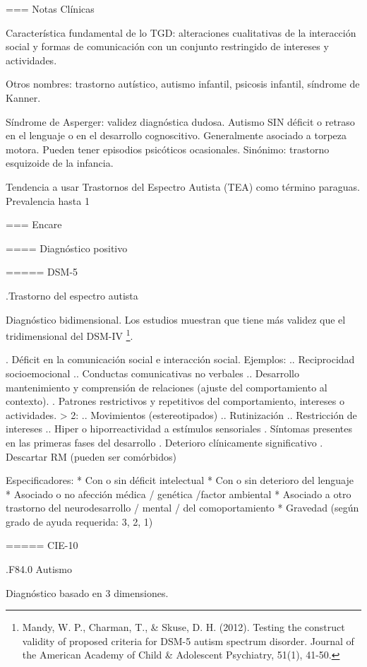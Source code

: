 \documentclass{scrbook}
\begin{document}
=== Notas Clínicas

Característica fundamental de lo TGD: alteraciones cualitativas de la interacción social y formas de comunicación con un conjunto restringido de intereses y actividades.

Otros nombres: trastorno autístico, autismo infantil, psicosis infantil, síndrome de Kanner.

Síndrome de Asperger: validez diagnóstica dudosa. Autismo SIN déficit o retraso en el lenguaje o en el desarrollo cognoscitivo. Generalmente asociado a torpeza motora. Pueden tener episodios psicóticos ocasionales. Sinónimo: trastorno esquizoide de la infancia.

Tendencia a usar Trastornos del Espectro Autista (TEA) como término paraguas. Prevalencia hasta 1%

=== Encare

==== Diagnóstico positivo

===== DSM-5

.Trastorno del espectro autista

Diagnóstico bidimensional. Los estudios muestran que tiene más validez que el tridimensional del DSM-IV \footnote{Mandy, W. P., Charman, T., \& Skuse, D. H. (2012). Testing the construct validity of proposed criteria for DSM-5 autism spectrum disorder. Journal of the American Academy of Child \& Adolescent Psychiatry, 51(1), 41-50.}.

. Déficit en la comunicación social e interacción social. Ejemplos:
.. Reciprocidad socioemocional
.. Conductas comunicativas no verbales
.. Desarrollo mantenimiento y comprensión de relaciones (ajuste del comportamiento al contexto).
. Patrones restrictivos y repetitivos del comportamiento, intereses o actividades. > 2:
.. Movimientos (estereotipados)
.. Rutinización
.. Restricción de intereses
.. Hiper o hiporreactividad a estímulos sensoriales
. Síntomas presentes en las primeras fases del desarrollo
. Deterioro clínicamente significativo
. Descartar RM (pueden ser comórbidos)

Especificadores:
* Con o sin déficit intelectual
* Con o sin deterioro del lenguaje
* Asociado o no afección médica / genética /factor ambiental
* Asociado a otro trastorno del neurodesarrollo / mental / del comoportamiento
* Gravedad (según grado de ayuda requerida: 3, 2, 1)

===== CIE-10

.F84.0 Autismo

Diagnóstico basado en 3 dimensiones.
\end{document}
